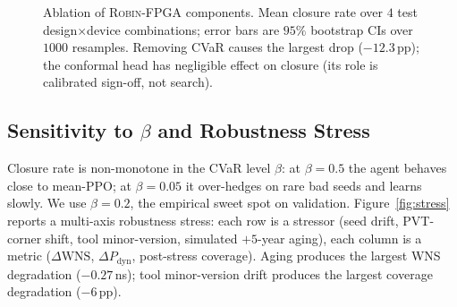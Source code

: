 \documentclass[journal,onecolumn=false]{IEEEtran}
\begin{document}
\begin{figure}[t]
\centering
{}
\caption{Ablation of \textsc{Robin-FPGA} components. Mean closure rate over $4$ test design$\times$device combinations; error bars are $95\%$ bootstrap CIs over $1000$ resamples. Removing CVaR causes the largest drop ($-12.3$\,pp); the conformal head has negligible effect on closure (its role is calibrated sign-off, not search).}
\label{fig:abl}
\end{figure}

\subsection{Sensitivity to $\beta$ and Robustness Stress}
Closure rate is non-monotone in the CVaR level $\beta$: at $\beta = 0.5$ the agent behaves close to mean-PPO; at $\beta = 0.05$ it over-hedges on rare bad seeds and learns slowly. We use $\beta = 0.2$, the empirical sweet spot on validation. Figure~\ref{fig:stress} reports a multi-axis robustness stress: each row is a stressor (seed drift, PVT-corner shift, tool minor-version, simulated $+5$-year aging), each column is a metric ($\Delta\mathrm{WNS}$, $\Delta P_{\text{dyn}}$, post-stress coverage). Aging produces the largest WNS degradation ($-0.27$\,ns); tool minor-version drift produces the largest coverage degradation ($-6$\,pp).
\end{document}
